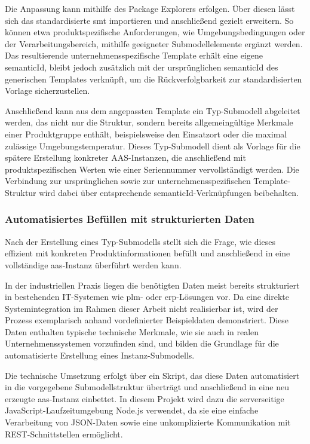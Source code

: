 Die Anpassung kann mithilfe des Package Explorers erfolgen.
Über diesen lässt sich das standardisierte \acs{smt} importieren und anschließend gezielt erweitern.
So können etwa produktspezifische Anforderungen, wie Umgebungsbedingungen oder der Verarbeitungsbereich, mithilfe geeigneter Submodellelemente ergänzt werden.
Das resultierende unternehmensspezifische Template erhält eine eigene semanticId, bleibt jedoch zusätzlich mit der ursprünglichen semanticId des generischen Templates verknüpft, um die Rückverfolgbarkeit zur standardisierten Vorlage sicherzustellen.

Anschließend kann aus dem angepassten Template ein Typ-Submodell abgeleitet werden, das nicht nur die Struktur, sondern bereits allgemeingültige Merkmale einer Produktgruppe enthält, beispielsweise den Einsatzort oder die maximal zulässige Umgebungstemperatur.
Dieses Typ-Submodell dient als Vorlage für die spätere Erstellung konkreter AAS-Instanzen, die anschließend mit produktspezifischen Werten wie einer Seriennummer vervollständigt werden.
Die Verbindung zur ursprünglichen sowie zur unternehmensspezifischen Template-Struktur wird dabei über entsprechende semanticId-Verknüpfungen beibehalten.


\subsubsection{Automatisiertes Befüllen mit strukturierten Daten}
Nach der Erstellung eines Typ-Submodells stellt sich die Frage, wie dieses effizient mit konkreten Produktinformationen befüllt und anschließend in eine vollständige \acs{aas}-Instanz überführt werden kann.

In der industriellen Praxis liegen die benötigten Daten meist bereits strukturiert in bestehenden IT-Systemen wie \acs{plm}- oder \acs{erp}-Lösungen vor.
Da eine direkte Systemintegration im Rahmen dieser Arbeit nicht realisierbar ist, wird der Prozess exemplarisch anhand vordefinierter Beispieldaten demonstriert.
Diese Daten enthalten typische technische Merkmale, wie sie auch in realen Unternehmenssystemen vorzufinden sind, und bilden die Grundlage für die automatisierte Erstellung eines Instanz-Submodells.

Die technische Umsetzung erfolgt über ein Skript, das diese Daten automatisiert in die vorgegebene Submodellstruktur überträgt und anschließend in eine neu erzeugte \acs{aas}-Instanz einbettet.
In diesem Projekt wird dazu die serverseitige JavaScript-Laufzeitumgebung Node.js \cite{nodejs} verwendet, da sie eine einfache Verarbeitung von JSON-Daten sowie eine unkomplizierte Kommunikation mit REST-Schnittstellen ermöglicht. 

